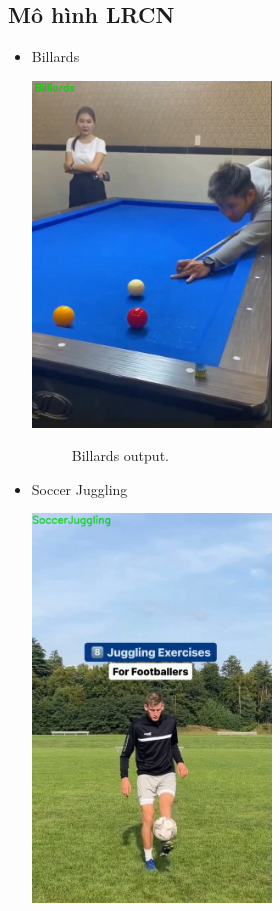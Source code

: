 \subsection{Mô hình LRCN}

\begin{itemize}
    \item Billards
    
        \includegraphics[width=0.5\textwidth]{Figures/bia_lrcn.png}
        \begin{figure}[h!]
    	\centering
    	\caption[Billards output .]{Billards output.}
    	\label{bia_lrcn.png} 
        \end{figure}
    \item Soccer Juggling

        \includegraphics[width=0.5\textwidth]{Figures/soccer_lrcn.png}
        \begin{figure}[h!]
    	\centering
    	

\end{figure}
\end{itemize}
